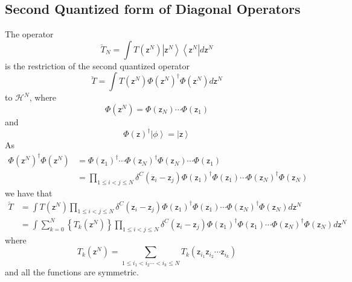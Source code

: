 \documentclass[aps,preprint]{revtex4}%
\begin{document}
\subsection{Second Quantized form of Diagonal Operators}

The operator
\begin{equation}
\breve{T}_{N}=\int T\left(  \mathsf{z}^{N}\right)  \left\vert \mathsf{z}%
^{N}\right\rangle \left\langle \mathsf{z}^{N}\right\vert d\mathsf{z}^{N}%
\end{equation}
is the restriction of the second quantized operator%
\begin{equation}
\breve{T}=\int T\left(  \mathsf{z}^{N}\right)  \Phi\left(  \mathsf{z}%
^{N}\right)  ^{\dagger}\Phi\left(  \mathsf{z}^{N}\right)  d\mathsf{z}^{N}%
\end{equation}
to $\mathcal{H}^{N}$, where
\begin{equation}
\Phi\left(  \mathsf{z}^{N}\right)  =\Phi\left(  \mathsf{z}_{N}\right)
\cdots\Phi\left(  \mathsf{z}_{1}\right)
\end{equation}
and
\begin{equation}
\Phi\left(  \mathsf{z}\right)  ^{\dagger}\left\vert \phi\right\rangle
=\left\vert \mathsf{z}\right\rangle
\end{equation}
As%
\begin{align}
\Phi\left(  \mathsf{z}^{N}\right)  ^{\dagger}\Phi\left(  \mathsf{z}%
^{N}\right)   &  =\Phi\left(  \mathsf{z}_{1}\right)  ^{\dagger}\cdots
\Phi\left(  \mathsf{z}_{N}\right)  ^{\dagger}\Phi\left(  \mathsf{z}%
_{N}\right)  \cdots\Phi\left(  \mathsf{z}_{1}\right) \nonumber\\
&  =\prod_{1\leq i<j\leq N}\delta^{C}\left(  \mathsf{z}_{i}-\mathsf{z}%
_{j}\right)  \Phi\left(  \mathsf{z}_{1}\right)  ^{\dagger}\Phi\left(
\mathsf{z}_{1}\right)  \cdots\Phi\left(  \mathsf{z}_{N}\right)  ^{\dagger}%
\Phi\left(  \mathsf{z}_{N}\right)
\end{align}
we have that%
\begin{align}
\breve{T}  &  =\int T\left(  \mathsf{z}^{N}\right)  \prod_{1\leq i<j\leq
N}\delta^{C}\left(  \mathsf{z}_{i}-\mathsf{z}_{j}\right)  \Phi\left(
\mathsf{z}_{1}\right)  ^{\dagger}\Phi\left(  \mathsf{z}_{1}\right)  \cdots
\Phi\left(  \mathsf{z}_{N}\right)  ^{\dagger}\Phi\left(  \mathsf{z}%
_{N}\right)  d\mathsf{z}^{N}\nonumber\\
&  =\int\sum_{k=0}^{N}\left\{  T_{k}\left(  \mathsf{z}^{N}\right)  \right\}
\prod_{1\leq i<j\leq N}\delta^{C}\left(  \mathsf{z}_{i}-\mathsf{z}_{j}\right)
\Phi\left(  \mathsf{z}_{1}\right)  ^{\dagger}\Phi\left(  \mathsf{z}%
_{1}\right)  \cdots\Phi\left(  \mathsf{z}_{N}\right)  ^{\dagger}\Phi\left(
\mathsf{z}_{N}\right)  d\mathsf{z}^{N}%
\end{align}
where
\begin{equation}
T_{k}\left(  \mathsf{z}^{N}\right)  =\sum_{1\leq i_{1}<i_{2}\cdots<i_{k}\leq
N}T_{k}\left(  \mathsf{z}_{i_{1}}\mathsf{z}_{i_{2}}\cdots\mathsf{z}_{i_{k}%
}\right)
\end{equation}
and all the functions are symmetric.
\end{document}
